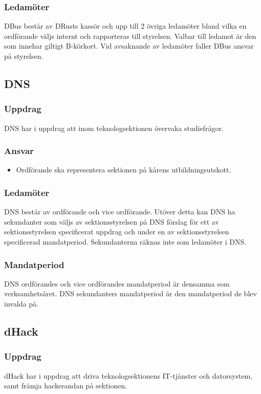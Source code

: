 \subsubsection{Ledamöter}
DBus består av DRusts kassör och upp till 2 övriga ledamöter bland vilka en ordförande väljs internt och rapporteras till styrelsen. Valbar till ledamot är den som innehar giltigt B-körkort. Vid avsaknande av ledamöter faller DBus ansvar på styrelsen.

\subsection{DNS}
\subsubsection{Uppdrag}
DNS har i uppdrag att inom teknologsektionen övervaka studiefrågor.
\subsubsection{Ansvar}
\begin{itemize}
  \item Ordförande ska representera sektionen på kårens utbildningsutskott.
\end{itemize}
\subsubsection{Ledamöter}
DNS består av ordförande och vice ordförande. Utöver detta kan DNS ha sekundanter som väljs av sektionsstyrelsen på DNS förslag för ett av sektionsstyrelsen specificerat uppdrag och under en av sektionsstyrelsen specificerad mandatperiod. Sekundanterna räknas inte som ledamöter i DNS.
\subsubsection{Mandatperiod}
DNS ordförandes och vice ordförandes mandatperiod är densamma som verksamhetsåret. DNS sekundanters mandatperiod är den mandatperiod de blev invalda på.

\subsection{dHack}
\subsubsection{Uppdrag}
dHack har i uppdrag att driva teknologsektionens IT-tjänster och datorsystem, samt
främja hackerandan på sektionen.
